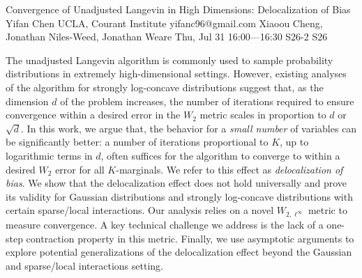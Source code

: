 \begin{talk}
\medskip


\end{talk}

\begin{talk}
  {Convergence of Unadjusted Langevin in High Dimensions: Delocalization of Bias}%
  {Yifan Chen}%
  {UCLA, Courant Institute}%
  {yifanc96@gmail.com}%
  {Xiaoou Cheng, Jonathan Niles-Weed, Jonathan Weare}%
  {}%
  {Thu, Jul 31 16:00---16:30}%
  {S26-2}%
  {S26}%
  
    
   
The unadjusted Langevin algorithm is commonly used to sample probability distributions in extremely high-dimensional settings. However, existing analyses of the algorithm for strongly log-concave distributions suggest that, as the dimension $d$ of the problem increases, the number of iterations required to ensure convergence within a desired error in the $W_2$ metric scales in proportion to $d$ or $\sqrt{d}$. In this work, we argue that, the behavior for a \emph{small number} of variables can be significantly better: a number of iterations proportional to $K$, up to logarithmic terms in $d$,
often suffices for the algorithm to converge to within a desired $W_2$ error for all $K$-marginals.
We refer to this effect as 
\textit{delocalization of bias}. 
We show that the delocalization effect does not hold universally and prove its validity for Gaussian distributions and strongly log-concave distributions with certain sparse/local interactions. Our analysis relies on a novel $W_{2,\ell^\infty}$ metric to measure convergence. A key technical challenge we address is the lack of a one-step contraction property in this metric. Finally, we use asymptotic arguments to explore potential generalizations of the delocalization effect beyond the Gaussian and sparse/local interactions setting.

\end{talk}

